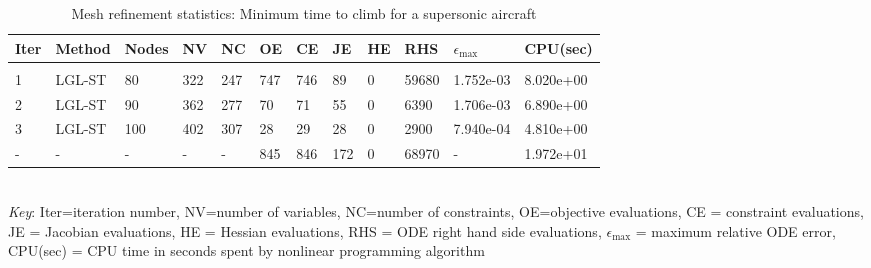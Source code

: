 
\begin{table}
\label{mesh_stats_Minimu}
\tiny
\begin{tabular}{llllllllllll}
Iter&Method&Nodes&NV&NC&OE&CE&JE&HE&RHS&$\epsilon_{\max}$&CPU(sec)\\ \hline \\
1&LGL-ST&80&322&247&747&746&89&0&59680&1.752e-03&8.020e+00\\
2&LGL-ST&90&362&277&70&71&55&0&6390&1.706e-03&6.890e+00\\
3&LGL-ST&100&402&307&28&29&28&0&2900&7.940e-04&4.810e+00\\
\hline
-&-&-&-&-&845&846&172&0&68970&-&1.972e+01\\
\end{tabular}
\newline \\ \emph{Key}: Iter=iteration number, NV=number of variables, NC=number of constraints, OE=objective evaluations,  	              CE = constraint evaluations, JE = Jacobian evaluations, HE = Hessian evaluations, RHS = ODE right hand side 		      evaluations, $\epsilon_{\max}$ = maximum relative ODE error, CPU(sec) = CPU time in seconds spent by nonlinear programming algorithm
\normalsize
\caption{Mesh refinement statistics: Minimum time to climb for a supersonic aircraft}
\end{table}
